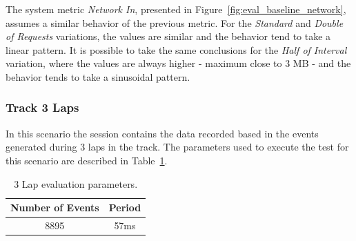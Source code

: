 The system metric \textit{Network In}, presented in Figure~\ref{fig:eval_baseline_network}, assumes a
similar behavior of the previous metric. For the \textit{Standard} and \textit{Double of Requests} variations,
the values are similar and the behavior tend to take a linear pattern. It is possible to take the same
conclusions for the \textit{Half of Interval} variation, where the values are always higher - maximum
close to 3 \gls{MB} - and the behavior tends to take a sinusoidal pattern.

\subsubsection{Track 3 Laps}
\label{subs:eval_exp_data_3laps}
In this scenario the session contains the data recorded based in the events generated during 3 laps
in the track. The parameters used to execute the test for this scenario are described in
Table~\ref{tab:3laps_parameters}.\\

\begin{table}[ht!]
  \begin{tabular}{|c|c|}
    \hline
    Number of Events & Period \\ \hline
    8895             & 57ms   \\ \hline
  \end{tabular}
  \caption{3 Lap evaluation parameters.}
  \label{tab:3laps_parameters}
\end{table}

